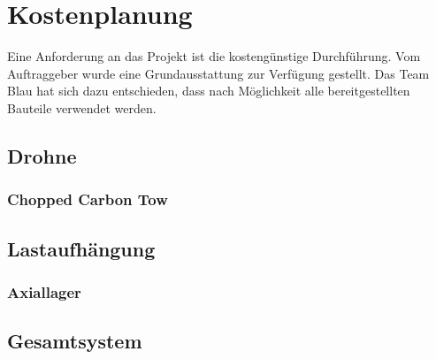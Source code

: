 \chapter{Kostenplanung}
Eine Anforderung an das Projekt ist die kostengünstige Durchführung. Vom Auftraggeber wurde eine Grundausstattung zur Verfügung gestellt. Das Team Blau hat sich dazu entschieden, dass nach Möglichkeit alle bereitgestellten Bauteile verwendet werden. 
\section{Drohne}
\subsection{Chopped Carbon Tow}


\section{Lastaufhängung}
\subsection{Axiallager}

\section{Gesamtsystem}